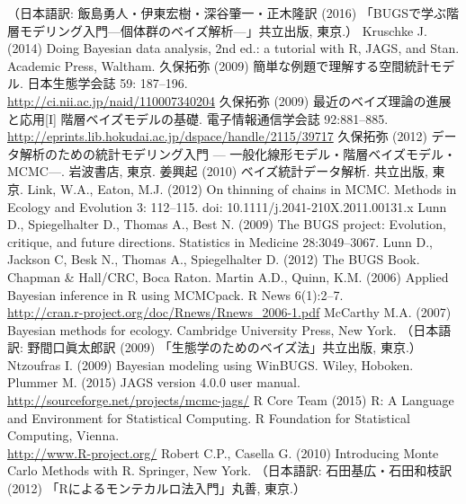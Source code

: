 \documentclass[11pt,uplatex]{jsarticle}
\begin{document}
\begin{thebibliography}{99}
    （日本語訳: 飯島勇人・伊東宏樹・深谷肇一・正木隆訳 (2016) 「BUGSで学ぶ階層モデリング入門---個体群のベイズ解析---」共立出版, 東京.）
 Kruschke J. (2014) Doing Bayesian data analysis, 2nd ed.:
  a tutorial with R, JAGS, and Stan. Academic Press, Waltham.
 久保拓弥 (2009) 簡単な例題で理解する空間統計モデル. 
  日本生態学会誌 59: 187--196. \\
  \url{http://ci.nii.ac.jp/naid/110007340204}
 久保拓弥 (2009) 最近のベイズ理論の進展と応用[I]
  階層ベイズモデルの基礎. 電子情報通信学会誌 92:881--885.\\
  \url{http://eprints.lib.hokudai.ac.jp/dspace/handle/2115/39717}
 久保拓弥 (2012) データ解析のための統計モデリング入門 ---
   一般化線形モデル・階層ベイズモデル・MCMC---. 岩波書店, 東京.
 姜興起 (2010) ベイズ統計データ解析. 共立出版, 東京.
 Link, W.A., Eaton, M.J. (2012) On thinning of chains in MCMC.
Methods in Ecology and Evolution 3: 112--115. doi: 10.1111/j.2041-210X.2011.00131.x
 Lunn D., Spiegelhalter D., Thomas A., Best N. (2009)
  {The BUGS project: Evolution, critique, and future directions}.
  {Statistics in Medicine} {28}:3049--3067.
 Lunn D., Jackson C, Besk N., Thomas A., Spiegelhalter D.
  (2012) The {BUGS} Book. Chapman \& Hall/CRC, Boca Raton.
 Martin A.D., Quinn, K.M. (2006) Applied Bayesian inference in R
using MCMCpack. R News 6(1):2--7. \\
    \url{http://cran.r-project.org/doc/Rnews/Rnews_2006-1.pdf}
 McCarthy M.A. (2007) Bayesian methods for ecology.
  Cambridge University Press, New York.
  （日本語訳: 野間口眞太郎訳 (2009) 「生態学のためのベイズ法」共立出版, 東京.）
 Ntzoufras I. (2009) Bayesian modeling using WinBUGS.
  Wiley, Hoboken.
 Plummer M. (2015) JAGS version 4.0.0 user manual.\\
  \url{http://sourceforge.net/projects/mcmc-jags/}
 R Core Team (2015)
   R: A Language and Environment for Statistical Computing.
   R Foundation for Statistical Computing, Vienna.\\
   \url{http://www.R-project.org/}
 Robert C.P., Casella G. (2010) Introducing Monte Carlo Methods with R.
  Springer, New York.
  （日本語訳: 石田基広・石田和枝訳 (2012) 「Rによるモンテカルロ法入門」丸善, 東京.）

\end{thebibliography}
\end{document}
